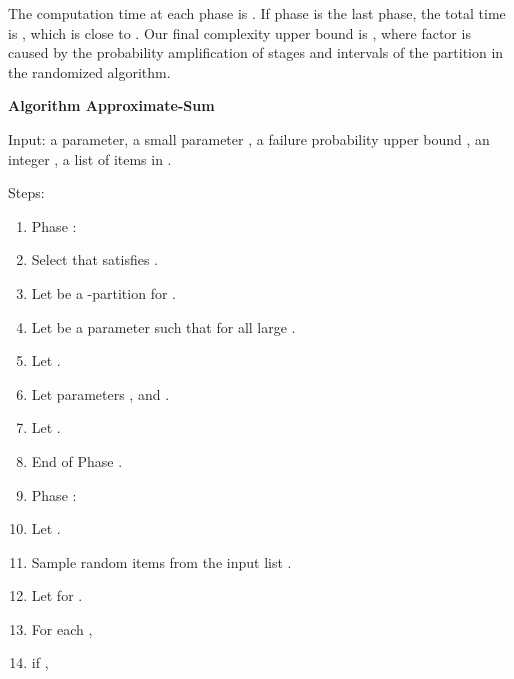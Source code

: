 \documentclass[runningheads]{llncs}
\begin{document}
The computation time at each phase  is . If phase  is
the last phase, the total time is , which is close to . Our final complexity upper bound is , where
 factor is caused by the probability amplification of
 stages and  intervals of the
 partition in the randomized algorithm.


\vskip 10pt





 {\bf Algorithm Approximate-Sum}


Input: a parameter, a small parameter , a failure
probability upper bound , an integer , a list  of 
items  in .




Steps:


\begin{enumerate}[1.]

\item
Phase :
\item\label{parameters-phase0}
\qquad Select   that satisfies
.

\item
\qquad Let  be a -partition  for .

\item\label{xi0-setting}
\qquad Let  be a parameter such that  for all large .

\item\label{first-alpha-setting}
\qquad Let .

\item\label{constant-setting-in-Approximate-Intervals}
\qquad Let parameters , and
.


\item
\qquad Let .

\item
End of Phase .

\item
Phase :



\item\label{loop-m-start}
\qquad Let .

\item
\qquad Sample  random items  from
the input list .

\item
\qquad Let  for
.




\item\label{I-j-loop}
\qquad For each ,

\item
\qquad\qquad if ,


\end{enumerate}
\end{document}
